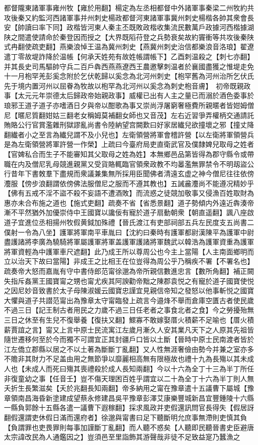 都督隴東諸軍事雍州牧【雍於用翻】楊定為左丞相都督中外諸軍事秦梁二州牧約共攻後秦又約監河西諸軍事并州刺史楊政都督河東諸軍事冀州刺史楊楷各帥其衆會長安【帥讀曰率下同】政楷皆河東人秦主丕既敗政楷收集流民數萬戶政據河西楷據湖陕之間遣使請命於秦登因而授之【大界既䧟苻登之兵勢衰矣故約竇衝等共攻後秦陕式冉翻使疏吏翻】燕樂浪悼王温為冀州刺史【燕冀州刺史治信都樂浪音洛琅】翟遼遣丁零故堤詐降於温帳【何承天姓苑有故姓帳謂帳下】乙酉刺温殺之【刺七亦翻】并其長史司馬驅帥守兵二百戶犇西燕燕遼西王農邀擊刺温者於襄國盡獲之惟堤走免　十一月枹罕羌彭奚念附於乞伏乾歸以奚念為北河州刺史【枹罕舊為河州治所乞伏氏先于境内置河州以屈眷為牧故以枹罕為北河州以奚念為刺史枹音膚】　初帝既親政事【太元元年崇德太后歸政帝始親政事】威權已出有人主之量已而溺於酒色委事於琅邪王道子道子亦嗜酒日夕與帝以酣歌為事又崇尚浮屠窮奢極費所親暱者皆姏姆僧尼【暱尼質翻姏姑三翻老女稱姆莫補翻女師也又音茂】左右近習爭弄權柄交通請託賄賂公行官賞濫雜刑獄謬亂尚書令陸納望宫闕歎曰好家居纎兒欲撞壞之邪【撞丈降翻纎者小之至言為纎兒謂不及小兒也】左衛領營將軍會稽許營【以左衛將軍領營兵是為左衛領營將軍許營一作榮】上疏曰今臺府局吏直衛武官及僕隸婢兒取母之姓者【官婢私合而生子不能審知其父取母之姓為姓】本無鄉邑品第皆得為郡守縣令或帶職在内及僧尼乳母競進親黨又受貨賂輒臨官領衆政教不均㬥濫無罪禁令不明刼盜公行昔年下書敇羣下盡規而衆議兼集無所採用臣聞佛者清遠玄虚之神今僧尼往往依傍灋服【傍步浪翻謂依傍佛法服僧尼之服而不遵其教也】五誡麄灋尚不能遵况精妙乎【佛有五戒不淫不盜不殺不妄語不遭酒敗】而流惑之徒競加敬事又侵漁百姓取財為惠亦未合布施之道也【施式吏翻】疏奏不省【省悉景翻】道子勢傾内外遠近犇湊帝漸不平然猶外加優崇侍中王國寶以讒佞有寵於道子扇動朝衆【朝直遥翻】諷八座啟道子宜進位丞相揚州牧假黄鉞加殊禮【晉氏渡江有吏部祠部五兵左民度支五尚書二僕射一令為八坐】護軍將軍南平車胤曰【沈約曰秦時有護軍都尉漢陳平為護軍中尉盡護諸將李廣為驍騎將軍屬護軍將軍盖護軍護諸將軍魏武以韓浩為護軍資重為護軍將軍資輕為中護軍車尺遮翻】此乃成王所以尊周公也今主上當陽【人主南面鄉明而立以治天下故曰當陽】非成王之比相王在位豈得為周公乎乃稱疾不署【不署名也】疏奏帝大怒而嘉胤有守中書侍郎范甯徐邈為帝所親信數進忠言【數所角翻】補正闕失指斥姦黨王國寶甯之甥也甯尤疾其阿諛勸帝黜之陳郡袁悦之有寵於道子國寶使悦之因尼妙音致書於太子母陳淑媛云國寶忠謹宜見親信帝知之發怒以他事斬悦之國寶大懼與道子共譛范甯出為豫章太守甯臨發上疏言今邉烽不舉而倉庫空匱古者使民歲不過三日【記王制古者用民之力歲不過三日任老者之事食北者之食】今之勞擾殆無三日之休至有生兒不復舉養【復扶又翻】鰥寡不敢嫁娶厝火積薪不足喻也【厝火積薪賈誼之言】甯又上言中原士民流寓江左歲月漸久人安其業凡天下之人原其先祖皆隨世遷移何至於今而獨不可謂宜正其封疆戶口皆以土斷【晉時中原士民南渡者皆於江左僑立郡縣以居之不以土著為斷斷丁亂翻】又人性無涯奢儉由勢今并兼之室亦多不贍非其財力不足盖由用之無節爭以靡麗相高無有限極故也禮十九為長殤以其未成人也【未成人而死曰殤其喪禮殺於成人長知兩翻】今以十六為全丁十三為半丁所任非復童幼之事【任音壬】豈不傷天理困百姓乎謂宜以二十為全丁十六為半丁則人無夭折生長繁滋矣【夭於兆翻長知兩翻】帝多納用之甯在豫章遣十五議曹下屬城【豫章領南昌海昏新塗建成望蔡永修建昌吳平豫章彭澤艾康樂豐城新昌宜豐鍾陵十六縣一縣負郭餘十五縣各遣一議曹下遐稼翻】採求風政并吏假還訊問官長得失【假居訝翻假還謂吏休假日滿而還府者】徐邈與甯書曰足下聽斷明允庶事無滯則吏慎其負【負謂罪也吏畏罪則每事加謹斷丁亂翻】而人聽不惑矣【人聽即民聽晉書史臣避唐太宗諱改民為人通鑑因之】豈須邑至里詣飾其游聲哉非徒不足致益寔乃蠶漁之